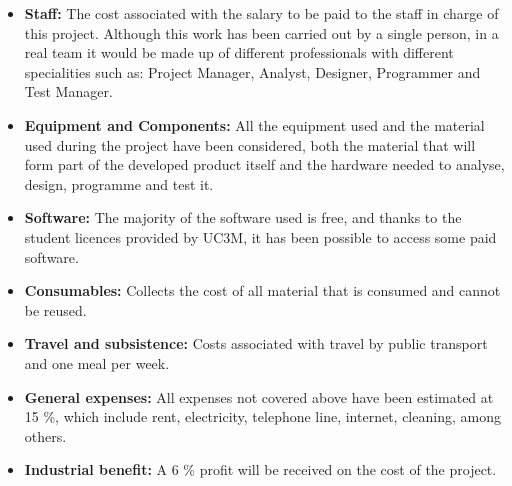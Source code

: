 \begin{itemize}
	\item \textbf{Staff:} The cost associated with the salary to be paid to the staff in charge of this project. Although this work has been carried out by a single person, in a real team it would be made up of different professionals with different specialities such as: Project Manager, Analyst, Designer, Programmer and Test Manager.
	\item \textbf{Equipment and Components:} All the equipment used and the material used during the project have been considered, both the material that will form part of the developed product itself and the hardware needed to analyse, design, programme and test it.
	\item \textbf{Software:} The majority of the software used is free, and thanks to the student licences provided by UC3M, it has been possible to access some paid software.
	\item \textbf{Consumables:} Collects the cost of all material that is consumed and cannot be reused.
	\item \textbf{Travel and subsistence:} Costs associated with travel by public transport and one meal per week.
	\item \textbf{General expenses:} All expenses not covered above have been estimated at 15 \%, which include rent, electricity, telephone line, internet, cleaning, among others.
	\item \textbf{Industrial benefit:} A 6 \% profit will be received on the cost of the project.
\end{itemize}

